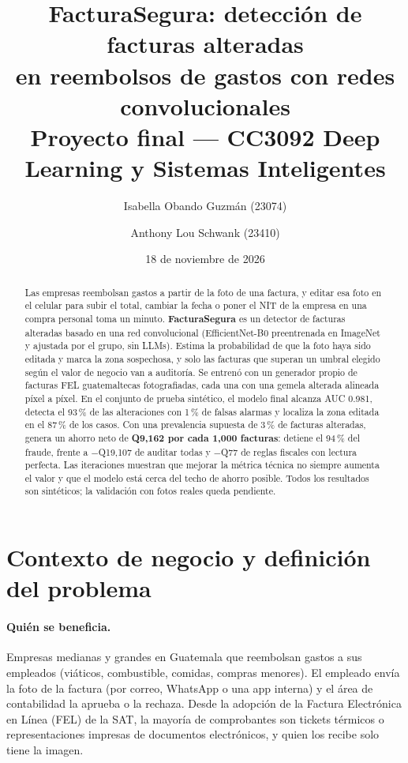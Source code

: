 \documentclass[11pt,letterpaper]{article}
\title{\textbf{FacturaSegura: detección de facturas alteradas\\en reembolsos de gastos con redes convolucionales}\\[4pt]
\large Proyecto final --- CC3092 Deep Learning y Sistemas Inteligentes}
\author{Isabella Obando Guzmán (23074) \and Anthony Lou Schwank (23410)}
\date{18 de noviembre de 2026}
\begin{document}
\maketitle

\begin{abstract}
Las empresas reembolsan gastos a partir de la foto de una factura, y editar esa foto en el celular para subir el total, cambiar la fecha o poner el NIT de la empresa en una compra personal toma un minuto. \textbf{FacturaSegura} es un detector de facturas alteradas basado en una red convolucional (EfficientNet-B0 preentrenada en ImageNet y ajustada por el grupo, sin LLMs). Estima la probabilidad de que la foto haya sido editada y marca la zona sospechosa, y solo las facturas que superan un umbral elegido según el valor de negocio van a auditoría. Se entrenó con un generador propio de facturas FEL guatemaltecas fotografiadas, cada una con una gemela alterada alineada píxel a píxel. En el conjunto de prueba sintético, el modelo final alcanza AUC 0.981, detecta el 93\,\% de las alteraciones con 1\,\% de falsas alarmas y localiza la zona editada en el 87\,\% de los casos. Con una prevalencia supuesta de 3\,\% de facturas alteradas, genera un ahorro neto de \textbf{Q9,162 por cada 1,000 facturas}: detiene el 94\,\% del fraude, frente a $-$Q19,107 de auditar todas y $-$Q77 de reglas fiscales con lectura perfecta. Las iteraciones muestran que mejorar la métrica técnica no siempre aumenta el valor y que el modelo está cerca del techo de ahorro posible. Todos los resultados son sintéticos; la validación con fotos reales queda pendiente.
\end{abstract}

\section{Contexto de negocio y definición del problema}

\paragraph{Quién se beneficia.} Empresas medianas y grandes en Guatemala que reembolsan gastos a sus empleados (viáticos, combustible, comidas, compras menores). El empleado envía la foto de la factura (por correo, WhatsApp o una app interna) y el área de contabilidad la aprueba o la rechaza. Desde la adopción de la Factura Electrónica en Línea (FEL) de la SAT, la mayoría de comprobantes son tickets térmicos o representaciones impresas de documentos electrónicos, y quien los recibe solo tiene la imagen.
\end{document}
